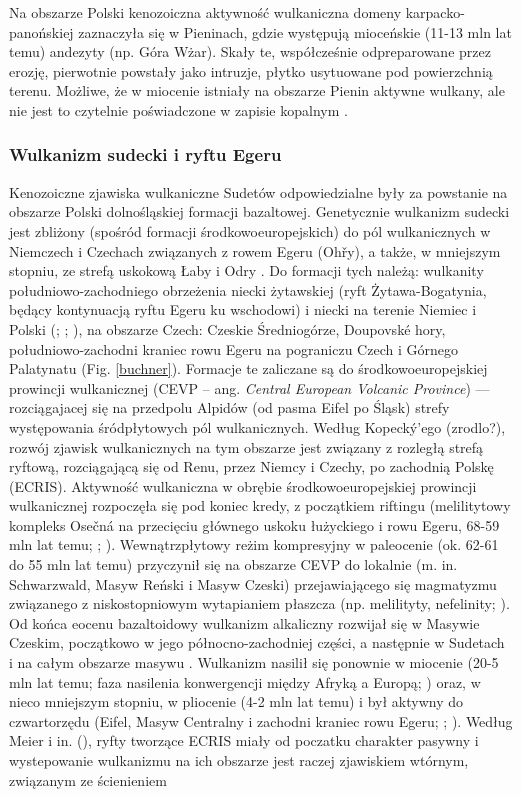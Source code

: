 \documentclass[11.5pt,twoside]{report}
\begin{document}
 Na obszarze Polski kenozoiczna aktywność wulkaniczna domeny karpacko-panońskiej zaznaczyła się w Pieninach, gdzie występują mioceńskie (11-13 mln lat temu) andezyty (np. Góra Wżar). Skały te, współcześnie odpreparowane przez erozję, pierwotnie powstały jako intruzje, płytko usytuowane pod powierzchnią terenu. Możliwe, że w miocenie istniały na obszarze Pienin aktywne wulkany, ale nie jest to czytelnie poświadczone w zapisie kopalnym \parencite{Krzeminska.2011}.
 
 \subsubsection{Wulkanizm sudecki i ryftu Egeru}
 
 Kenozoiczne zjawiska wulkaniczne Sudetów odpowiedzialne były za powstanie na obszarze Polski dolnośląskiej formacji bazaltowej. Genetycznie wulkanizm sudecki jest zbliżony (spośród formacji środkowoeuropejskich) do pól wulkanicznych w Niemczech i Czechach związanych z rowem Egeru (Oh\v{r}y), a także, w mniejszym stopniu, ze strefą uskokową Łaby i Odry \parencite{Puziewicz.2011}. Do formacji tych należą: wulkanity południowo-zachodniego obrzeżenia niecki żytawskiej (ryft Żytawa-Bogatynia, będący kontynuacją ryftu Egeru ku wschodowi) i niecki  na terenie Niemiec i Polski (\cite{Buchner.2015}; \cite{Szymkowiak.1985}; \cite{Panasiuk.1980}), na obszarze Czech: Czeskie Średniogórze, Doupovské hory, południowo-zachodni kraniec rowu Egeru na pograniczu Czech i Górnego Palatynatu (Fig. \ref{buchner}). Formacje te zaliczane są do środkowoeuropejskiej prowincji wulkanicznej (CEVP -- ang. \textit{Central European Volcanic Province}) --- rozciągajacej się na przedpolu Alpidów (od pasma Eifel po Śląsk) strefy występowania śródpłytowych pól wulkanicznych. Według Kopeck\'{y}'ego (zrodlo?), rozwój zjawisk wulkanicznych na tym obszarze jest związany z rozległą strefą ryftową, rozciągającą się od Renu, przez Niemcy i Czechy, po zachodnią Polskę (ECRIS). Aktywność wulkaniczna w obrębie środkowoeuropejskiej prowincji wulkanicznej rozpoczęła się pod koniec kredy, z początkiem riftingu (melilitytowy kompleks Osečná na przecięciu głównego uskoku łużyckiego i rowu Egeru, 68-59 mln lat temu; \cite{Ulrych.2008}; \cite{Ulrych.2000}). Wewnątrzpłytowy reżim kompresyjny w paleocenie (ok. 62-61 do 55 mln lat temu) przyczynił się na obszarze CEVP do lokalnie (m. in. Schwarzwald, Masyw Reński i Masyw Czeski) przejawiającego się magmatyzmu związanego z niskostopniowym wytapianiem płaszcza (np. melilityty, nefelinity; \cite{Wilson.2006}). Od końca eocenu bazaltoidowy wulkanizm alkaliczny rozwijał się w Masywie Czeskim, początkowo w jego północno-zachodniej części, a następnie w Sudetach i na całym obszarze masywu \parencite{Sobczyk.2015}. Wulkanizm nasilił się ponownie w miocenie (20-5 mln lat temu; faza nasilenia konwergencji między Afryką a Europą; \cite{Wilson.2006}) oraz, w nieco mniejszym stopniu, w pliocenie (4-2 mln lat temu) i był aktywny do czwartorzędu (Eifel, Masyw Centralny i zachodni kraniec rowu Egeru; \cite{Meier.2016}; \cite{Wilson.2006}). Według Meier i in. (\citeyear{Meier.2016}), ryfty tworzące ECRIS miały od poczatku charakter pasywny i wystepowanie wulkanizmu na ich obszarze jest raczej zjawiskiem wtórnym, związanym ze ścienieniem 
\end{document}
